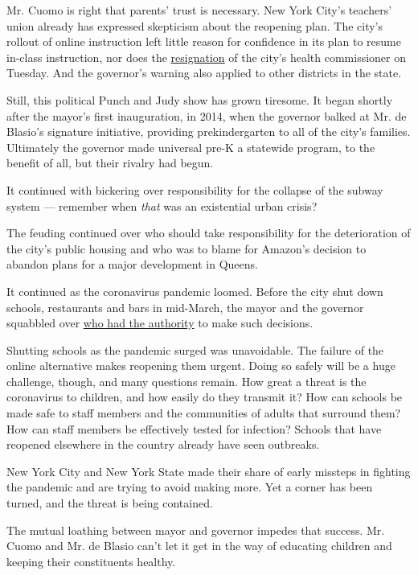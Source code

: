 Mr. Cuomo is right that parents' trust is necessary. New York City's
teachers' union already has expressed skepticism about the reopening
plan. The city's rollout of online instruction left little reason for
confidence in its plan to resume in-class instruction, nor does the
\href{https://www.nytimes.com/2020/08/04/nyregion/oxiris-barbot-health-commissioner-resigns.html?referringSource=articleShare}{resignation}
of the city's health commissioner on Tuesday. And the governor's warning
also applied to other districts in the state.

Still, this political Punch and Judy show has grown tiresome. It began
shortly after the mayor's first inauguration, in 2014, when the governor
balked at Mr. de Blasio's signature initiative, providing
prekindergarten to all of the city's families. Ultimately the governor
made universal pre-K a statewide program, to the benefit of all, but
their rivalry had begun.

It continued with bickering over responsibility for the collapse of the
subway system --- remember when \emph{that} was an existential urban
crisis?

The feuding continued over who should take responsibility for the
deterioration of the city's public housing and who was to blame for
Amazon's decision to abandon plans for a major development in Queens.

It continued as the coronavirus pandemic loomed. Before the city shut
down schools, restaurants and bars in mid-March, the mayor and the
governor squabbled over
\href{https://www.nytimes.com/2020/03/17/nyregion/coronavirus-nyc-shelter-in-place.html}{who
had the authority} to make such decisions.

Shutting schools as the pandemic surged was unavoidable. The failure of
the online alternative makes reopening them urgent. Doing so safely will
be a huge challenge, though, and many questions remain. How great a
threat is the coronavirus to children, and how easily do they transmit
it? How can schools be made safe to staff members and the communities of
adults that surround them? How can staff members be effectively tested
for infection? Schools that have reopened elsewhere in the country
already have seen outbreaks.

New York City and New York State made their share of early missteps in
fighting the pandemic and are trying to avoid making more. Yet a corner
has been turned, and the threat is being contained.

The mutual loathing between mayor and governor impedes that success. Mr.
Cuomo and Mr. de Blasio can't let it get in the way of educating
children and keeping their constituents healthy.

